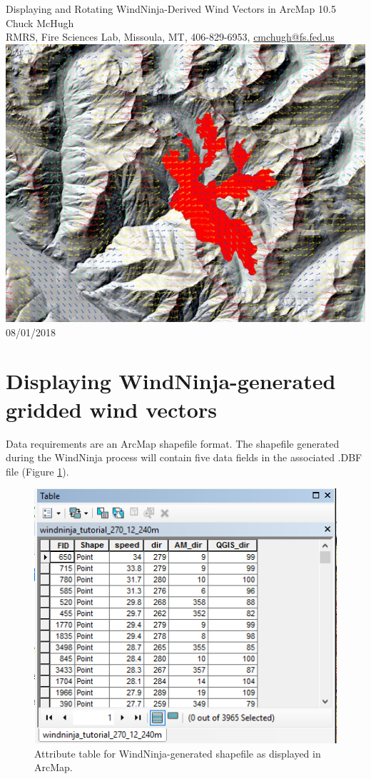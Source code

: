 \documentclass[12pt]{article}
\begin{document}
\begin{titlepage}
    \centering
    {\Huge
        Displaying and Rotating WindNinja-Derived
Wind Vectors in ArcMap 10.5
    }
    \vfill
    {\Large
    Chuck McHugh\\ RMRS, Fire Sciences Lab, Missoula, MT, 406-829-6953, \href{mailto:cmchugh@fs.fed.us}{cmchugh@fs.fed.us}
    }
    \vfill
    \includegraphics[scale=0.6]							{arc_00.png}
    \vfill
  	{\Huge
	  08/01/2018 %
  	}
    \vfill
\end{titlepage}

\section*{Displaying WindNinja-generated gridded wind vectors}
Data requirements are an ArcMap shapefile format. The shapefile generated during the WindNinja process will
contain five data fields in the associated .DBF file (Figure \ref{fig:Figure1}).

\begin{figure}[H]
	\centering
	\includegraphics[scale=0.9]{arc_1.png}
	\caption{Attribute table for WindNinja-generated shapefile as displayed in ArcMap.}
	\label{fig:Figure1}
\end{figure}
\end{document}
